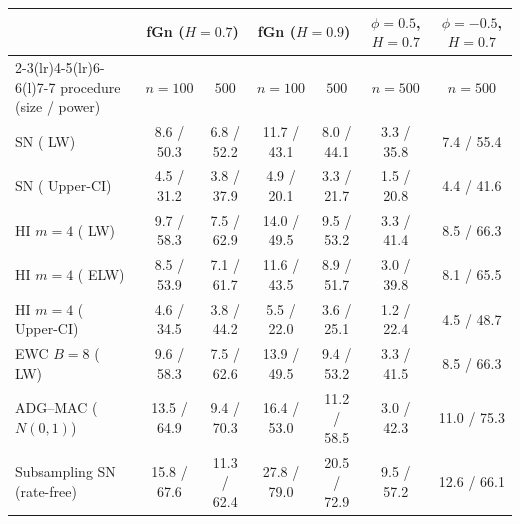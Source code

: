 \begin{tabular}{@{}lcccccc@{}}\toprule
 & \multicolumn{2}{c}{fGn ($H=0.7$)} & \multicolumn{2}{c}{fGn ($H=0.9$)} & \multicolumn{1}{c}{$\phi{=}0.5$, $H{=}0.7$} & \multicolumn{1}{c}{$\phi{=}-0.5$, $H{=}0.7$}\\
\cmidrule(lr){2-3}\cmidrule(lr){4-5}\cmidrule(lr){6-6}\cmidrule(l){7-7}
procedure (size / power) & $n=100$ & $500$ & $n=100$ & $500$ & $n=500$ & $n=500$\\\midrule
SN (\CosCert{} LW) & 8.6 / 50.3 & 6.8 / 52.2 & 11.7 / 43.1 & 8.0 / 44.1 & 3.3 / 35.8 & 7.4 / 55.4\\
SN (\CosCert{} Upper-CI) & 4.5 / 31.2 & 3.8 / 37.9 & 4.9 / 20.1 & 3.3 / 21.7 & 1.5 / 20.8 & 4.4 / 41.6\\
HI $m{=}4$ (\CosCert{} LW) & 9.7 / 58.3 & 7.5 / 62.9 & 14.0 / 49.5 & 9.5 / 53.2 & 3.3 / 41.4 & 8.5 / 66.3\\
HI $m{=}4$ (\CosCert{} ELW) & 8.5 / 53.9 & 7.1 / 61.7 & 11.6 / 43.5 & 8.9 / 51.7 & 3.0 / 39.8 & 8.1 / 65.5\\
HI $m{=}4$ (\CosCert{} Upper-CI) & 4.6 / 34.5 & 3.8 / 44.2 & 5.5 / 22.0 & 3.6 / 25.1 & 1.2 / 22.4 & 4.5 / 48.7\\
EWC $B{=}8$ (\CosCert{} LW) & 9.6 / 58.3 & 7.5 / 62.6 & 13.9 / 49.5 & 9.4 / 53.2 & 3.3 / 41.5 & 8.5 / 66.3\\
ADG--MAC ($N(0,1)$) & 13.5 / 64.9 & 9.4 / 70.3 & 16.4 / 53.0 & 11.2 / 58.5 & 3.0 / 42.3 & 11.0 / 75.3\\
Subsampling SN (rate-free) & 15.8 / 67.6 & 11.3 / 62.4 & 27.8 / 79.0 & 20.5 / 72.9 & 9.5 / 57.2 & 12.6 / 66.1\\
\bottomrule\end{tabular}
